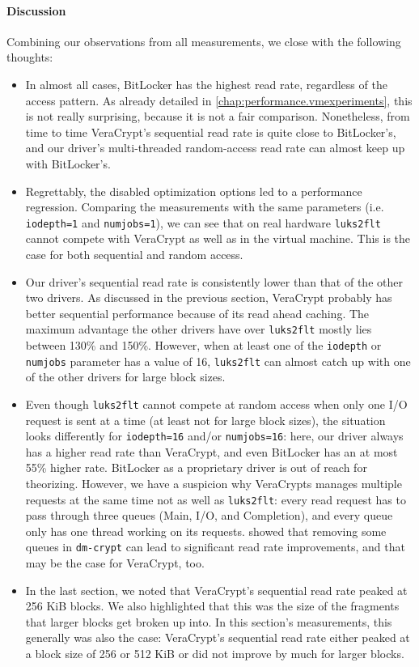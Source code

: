 \paragraph{Discussion}
Combining our observations from all measurements, we close with the following thoughts:
\begin{itemize}[beginpenalty=10000]
	\item In almost all cases, BitLocker has the highest read rate, regardless of the access pattern. As already detailed in \autoref{chap:performance.vmexperiments}, this is not really surprising, because it is not a fair comparison. Nonetheless, from time to time VeraCrypt's sequential read rate is quite close to BitLocker's, and our driver's multi-threaded random-access read rate can almost keep up with BitLocker's.
	\item Regrettably, the disabled optimization options led to a performance regression. Comparing the measurements with the same parameters (i.e. \texttt{iodepth=1} and \texttt{numjobs=1}), we can see that on real hardware \texttt{luks2flt} cannot compete with VeraCrypt as well as in the virtual machine. This is the case for both sequential and random access.
	\item Our driver's sequential read rate is consistently lower than that of the other two drivers. As discussed in the previous section, VeraCrypt probably has better sequential performance because of its read ahead caching. The maximum advantage the other drivers have over \texttt{luks2flt} mostly lies between 130\% and 150\%. However, when at least one of the \texttt{iodepth} or \texttt{numjobs} parameter has a value of 16, \texttt{luks2flt} can almost catch up with one of the other drivers for large block sizes.
	\item Even though \texttt{luks2flt} cannot compete at random access when only one I/O request is sent at a time (at least not for large block sizes), the situation looks differently for \texttt{iodepth=16} and/or \texttt{numjobs=16}: here, our driver always has a higher read rate than VeraCrypt, and even BitLocker has an at most 55\% higher rate. BitLocker as a proprietary driver is out of reach for theorizing. However, we have a suspicion why VeraCrypts manages multiple requests at the same time not as well as \texttt{luks2flt}: every read request has to pass through three queues (Main, I/O, and Completion), and every queue only has one thread working on its requests. \cite{Korchagin2020} showed that removing some queues in \texttt{dm-crypt} can lead to significant read rate improvements, and that may be the case for VeraCrypt, too.
	\item In the last section, we noted that VeraCrypt's sequential read rate peaked at 256 KiB blocks. We also highlighted that this was the size of the fragments that larger blocks get broken up into. In this section's measurements, this generally was also the case: VeraCrypt's sequential read rate either peaked at a block size of 256 or 512 KiB or did not improve by much for larger blocks.
\end{itemize}

